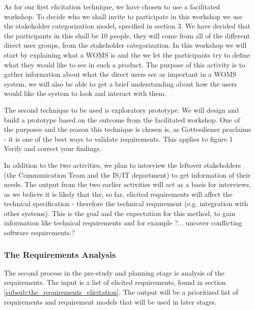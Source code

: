 \documentclass[a4paper]{article}
\begin{document}
As for our first elicitation technique, we have chosen to use a facilitated workshop. To decide who we shall invite to participate in this workshop we use the stakeholder categorization model, specified in section 3. We have decided that the participants in this shall be 10 people, they will come from all of the different direct user groups, from the stakeholder categorization. In this workshop we will start by explaining what a WOMS is and the we let the participants try to define what they would like to see in such a product. The purpose of this activity is to gather information about what the direct users see as important in a WOMS system, we will also be able to get a brief understanding about how the users would like the system to look and interact with them.

The second technique to be used is exploratory prototype. We will design and build a prototype based on the outcome from the facilitated workshop. One of the purposes and the reason this technique is chosen is, as Gottesdiener proclaims \cite{gott77} - it is one of the best ways to validate requirements. This applies to figure 1 Verify and correct your findings. 

In addition to the two activities, we plan to interview the leftover stakeholders (the Communication Team and the IS/IT department) to get information of their needs. The output from the two earlier activities will act as a basis for interviews, as we believe it is likely that the, so far, elicited requirements will affect the technical specification - therefore the technical requirement (e.g. integration with other systems). This is the goal and the expectation for this method, to gain information like technical requirements and for example ?... uncover conflicting software requirements.? \cite{gott65}

\subsubsection{The Requirements Analysis}
\label{subsub:the_requirements_analysis}
The second process in the pre-study and planning stage is analysis of the requirements. The input is a list of elicited requirements, found in section \ref{subsub:the_requirements_elicitation}. The output will be a prioritized list of requirements and requirement models that will be used in later stages.
\end{document}
